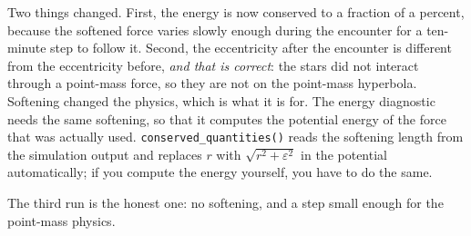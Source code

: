 \documentclass[
  10.5pt,
  letterpaper,
]{scrbook}
\newenvironment{Shaded}{\begin{snugshade}}{\end{snugshade}}
\newcommand{\AttributeTok}[1]{\textcolor[rgb]{0.00,0.00,0.00}{#1}}
\newcommand{\CommentTok}[1]{\textcolor[rgb]{0.00,0.00,0.00}{\textit{#1}}}
\newcommand{\DecValTok}[1]{\textcolor[rgb]{0.00,0.00,0.00}{#1}}
\newcommand{\FloatTok}[1]{\textcolor[rgb]{0.00,0.00,0.00}{#1}}
\newcommand{\FunctionTok}[1]{\textcolor[rgb]{0.00,0.00,0.00}{#1}}
\newcommand{\NormalTok}[1]{\textcolor[rgb]{0.00,0.00,0.00}{#1}}
\newcommand{\OtherTok}[1]{\textcolor[rgb]{0.00,0.00,0.00}{#1}}
\newcommand{\SpecialCharTok}[1]{\textcolor[rgb]{0.00,0.00,0.00}{#1}}
\newcommand{\StringTok}[1]{\textcolor[rgb]{0.00,0.00,0.00}{#1}}
\theoremstyle{definition}
\theoremstyle{plain}
\theoremstyle{remark}
\begin{document}
\begin{Shaded}
\end{Shaded}

Two things changed. First, the energy is now conserved to a fraction of
a percent, because the softened force varies slowly enough during the
encounter for a ten-minute step to follow it. Second, the eccentricity
after the encounter is different from the eccentricity before, \emph{and
that is correct}: the stars did not interact through a point-mass force,
so they are not on the point-mass hyperbola. Softening changed the
physics, which is what it is for. The energy diagnostic needs the same
softening, so that it computes the potential energy of the force that
was actually used. \texttt{conserved\_quantities()} reads the softening
length from the simulation output and replaces \(r\) with
\(\sqrt{r^2+\varepsilon^2}\) in the potential automatically; if you
compute the energy yourself, you have to do the same.

The third run is the honest one: no softening, and a step small enough
for the point-mass physics.
\end{document}
